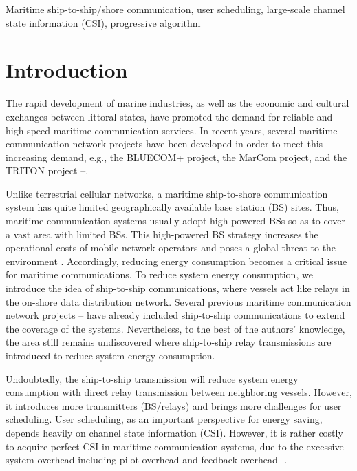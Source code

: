 \documentclass[journal]{IEEEtran}
\begin{document}
 \begin{IEEEkeywords}
 Maritime ship-to-ship/shore communication, user scheduling, large-scale channel state information (CSI), progressive algorithm
 \end{IEEEkeywords}

 
 \section{Introduction}\label{sec:1}

 The rapid development of marine industries, as well as the economic and cultural exchanges between littoral states, have promoted the demand for reliable and high-speed maritime communication services. In recent years, several maritime communication network projects have been developed in order to meet this increasing demand, e.g., the BLUECOM+ project, the MarCom project, and the TRITON project \cite{p321}--\cite{p32}. 
 
 Unlike terrestrial cellular networks, a maritime ship-to-shore communication system has quite limited geographically available base station (BS) sites. Thus, maritime communication systems usually adopt high-powered BSs so as to cover a vast area with limited BSs. This high-powered BS strategy increases the operational costs of mobile network operators and poses a global threat to the environment \cite{p33}.
 Accordingly, reducing energy consumption becomes a critical issue for maritime communications. 
 To reduce system energy consumption, we introduce the idea of ship-to-ship communications, where vessels act like relays in the on-shore data distribution network. Several previous maritime communication network projects \cite{p321}--\cite{p32} have already included ship-to-ship communications to extend the coverage of the systems. Nevertheless, to the best of the authors' knowledge, the area still remains undiscovered where ship-to-ship relay transmissions are introduced to reduce system energy consumption. 

 Undoubtedly, the ship-to-ship transmission will reduce system energy consumption with direct relay transmission between neighboring vessels. 
 However, it introduces more transmitters (BS/relays) and brings more challenges for user scheduling. %
 User scheduling, as an important perspective for energy saving, depends heavily on channel state information (CSI). However, it is rather costly to acquire perfect CSI in maritime communication systems, due to the excessive system overhead including pilot overhead and feedback overhead \cite{p403}-\cite{p407}. %
 
\end{document}
